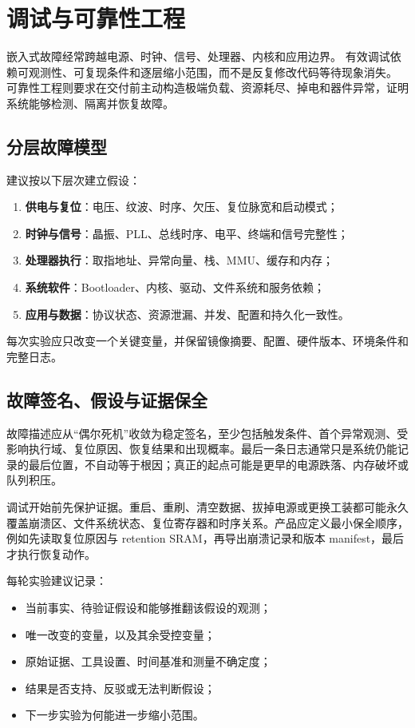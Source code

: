 \chapter{调试与可靠性工程}
\label{chap:debug-reliability}

嵌入式故障经常跨越电源、时钟、信号、处理器、内核和应用边界。
有效调试依赖可观测性、可复现条件和逐层缩小范围，而不是反复修改代码等待现象消失。
可靠性工程则要求在交付前主动构造极端负载、资源耗尽、掉电和器件异常，证明系统能够检测、隔离并恢复故障。

\section{分层故障模型}

建议按以下层次建立假设：
\begin{enumerate}
  \item \textbf{供电与复位}：电压、纹波、时序、欠压、复位脉宽和启动模式；
  \item \textbf{时钟与信号}：晶振、PLL、总线时序、电平、终端和信号完整性；
  \item \textbf{处理器执行}：取指地址、异常向量、栈、MMU、缓存和内存；
  \item \textbf{系统软件}：Bootloader、内核、驱动、文件系统和服务依赖；
  \item \textbf{应用与数据}：协议状态、资源泄漏、并发、配置和持久化一致性。
\end{enumerate}

每次实验应只改变一个关键变量，并保留镜像摘要、配置、硬件版本、环境条件和完整日志。

\section{故障签名、假设与证据保全}

故障描述应从“偶尔死机”收敛为稳定签名，至少包括触发条件、首个异常观测、受影响执行域、复位原因、恢复结果和出现概率。最后一条日志通常只是系统仍能记录的最后位置，不自动等于根因；真正的起点可能是更早的电源跌落、内存破坏或队列积压。

调试开始前先保护证据。重启、重刷、清空数据、拔掉电源或更换工装都可能永久覆盖崩溃区、文件系统状态、复位寄存器和时序关系。产品应定义最小保全顺序，例如先读取复位原因与 retention SRAM，再导出崩溃记录和版本 manifest，最后才执行恢复动作。

每轮实验建议记录：
\begin{itemize}
  \item 当前事实、待验证假设和能够推翻该假设的观测；
  \item 唯一改变的变量，以及其余受控变量；
  \item 原始证据、工具设置、时间基准和测量不确定度；
  \item 结果是否支持、反驳或无法判断假设；
  \item 下一步实验为何能进一步缩小范围。
\end{itemize}

